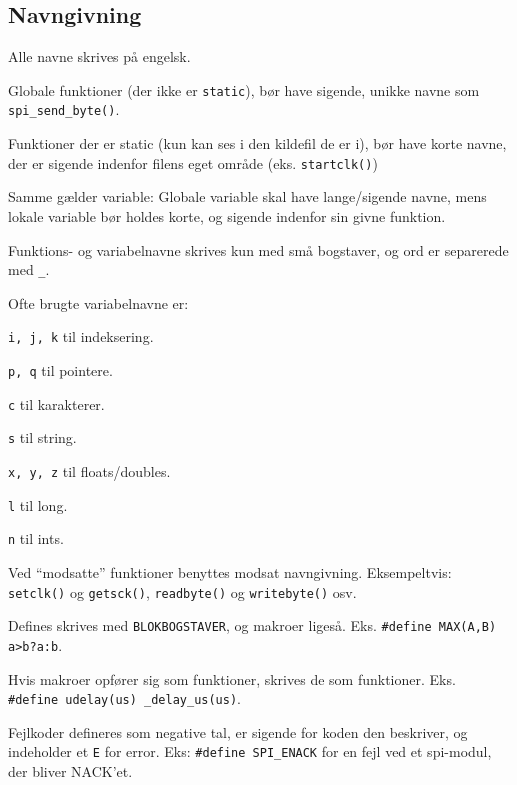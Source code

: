 \documentclass[article, 10pt]{memoir}
\let\tempone\itemize
\let\temptwo\enditemize
\renewenvironment{itemize}{\tempone\firmlist}{\temptwo}
\begin{document}
\begin{multicols}{2}
    \chapter{Navngivning}
    \begin{itemize}
        \item Alle navne skrives på engelsk.
        \item Globale funktioner (der ikke er \texttt{static}), bør have sigende, unikke navne som \texttt{spi\_send\_byte()}.
        \item Funktioner der er static (kun kan ses i den kildefil de er i), bør have korte navne, der er sigende indenfor filens eget område (eks. \texttt{startclk()})
        \item Samme gælder variable: Globale variable skal have lange/sigende navne, mens lokale variable bør holdes korte, og sigende indenfor sin givne funktion.
        \item Funktions- og variabelnavne skrives kun med små bogstaver, og ord er separerede med \texttt{\_}.
        \item Ofte brugte variabelnavne er:
            \begin{itemize}
                \item \texttt{i, j, k} til indeksering.
                \item \texttt{p, q} til pointere.
                \item \texttt{c} til karakterer.
                \item \texttt{s} til string.
                \item \texttt{x, y, z} til floats/doubles.
                \item \texttt{l} til long.
                \item \texttt{n} til ints.
            \end{itemize}
        \item Ved ``modsatte'' funktioner benyttes modsat navngivning. Eksempeltvis: \texttt{setclk()} og \texttt{getsck()}, \texttt{readbyte()} og \texttt{writebyte()} osv.
        \item Defines skrives med \texttt{BLOKBOGSTAVER}, og makroer ligeså. Eks. \texttt{\#define MAX(A,B) a>b?a:b}. 
            
            Hvis makroer opfører sig som funktioner, skrives de som funktioner. Eks. \texttt{\#define\ udelay(us) \_delay\_us(us)}.
        \item Fejlkoder defineres som negative tal, er sigende for koden den beskriver, og indeholder et \texttt{E} for error. Eks: \texttt{\#define SPI\_ENACK} for en fejl ved et spi-modul, der bliver NACK’et.
    \end{itemize}


\end{multicols}
\end{document}
